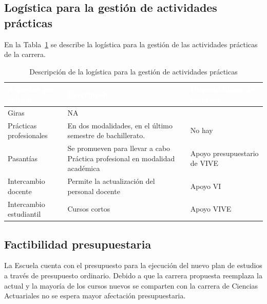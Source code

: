 \subsection{Logística para la gestión de actividades prácticas}
En la Tabla~\ref{tab:logistica-practicas} se describe la logística para la gestión de las actividades prácticas de la carrera.

\begin{table}[H]
\centering
\small
\setlength{\tabcolsep}{4pt}%
\renewcommand{\arraystretch}{1.3}%
%
\caption{Descripción de la logística para la gestión de actividades prácticas}
\label{tab:logistica-practicas}
\begin{tabular}{|>{\raggedright\arraybackslash}p{3.6cm}|>{\raggedright\arraybackslash}p{6.6cm}|>{\raggedright\arraybackslash}p{4.2cm}|}
\hline
\rowcolor{Azul-UCR}
\textcolor{white}{\textbf{Aspectos por valorar}} & \textcolor{white}{\textbf{Descripción}} & \textcolor{white}{\textbf{Disponibilidad de recursos}} \\ \hline
Giras & NA &  \\ \hline
Prácticas profesionales & En dos modalidades, en el último semestre de bachillerato. & No hay \\ \hline
Pasantías & Se promueven para llevar a cabo Práctica profesional en modalidad académica & Apoyo presupuestario de VIVE \\ \hline
Intercambio docente & Permite la actualización del personal docente & Apoyo VI \\ \hline
Intercambio estudiantil & Cursos cortos & Apoyo VIVE \\ \hline
\end{tabular}
%

\end{table}

\subsection{Factibilidad presupuestaria}

La Escuela cuenta con el presupuesto para la ejecución del nuevo plan de estudios a través de presupuesto ordinario. Debido a que la carrera propuesta reemplaza la actual y la mayoría de los cursos nuevos se comparten con la carrera de Ciencias Actuariales no se espera mayor afectación presupuestaria. 



